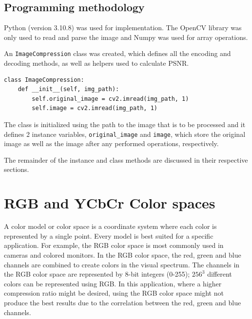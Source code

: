 \documentclass[10pt,twocolumn,letterpaper]{article}
\begin{document}
\subsection{Programming methodology}

Python (version 3.10.8) was used for implementation. The OpenCV library was only used to read and parse the image and Numpy was used for array operations.

An \verb|ImageCompression| class was created, which defines all the encoding and decoding methods, as well as helpers used to calculate PSNR.
{\footnotesize
\begin{verbatim}
class ImageCompression:
    def __init__(self, img_path):
        self.original_image = cv2.imread(img_path, 1)
        self.image = cv2.imread(img_path, 1)
\end{verbatim}}
The class is initialized using the path to the image that is to be processed and it defines 2 instance variables, \verb|original_image| and \verb|image|, which store the original image as well as the image after any performed operations, respectively.

The remainder of the instance and class methods are discussed in their respective sections.

\section{RGB and YCbCr Color spaces}

A color model or color space is a coordinate system where each color is represented by a single point. Every model is best suited for a specific application. For example, the RGB color space is most commonly used in cameras and colored monitors. In the RGB color space, the red, green and blue channels are combined to create colors in the visual spectrum. The channels in the RGB color space are represented by 8-bit integers (0-255); $256^3$ different colors can be represented using RGB. In this application, where a higher compression ratio might be desired, using the RGB color space might not produce the best results due to the correlation between the red, green and blue channels.
\end{document}
